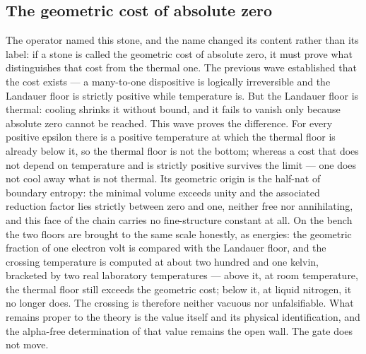 \documentclass[11pt]{article}
\theoremstyle{definition}\newtheorem{deriv}{Derivation}
\begin{document}
\subsection*{The geometric cost of absolute zero}The operator named this stone, and the name changed its content rather than its label: if a stone is called the geometric cost of absolute zero, it must prove what distinguishes that cost from the thermal one. The previous wave established that the cost exists --- a many-to-one dispositive is logically irreversible and the Landauer floor is strictly positive while temperature is. But the Landauer floor is thermal: cooling shrinks it without bound, and it fails to vanish only because absolute zero cannot be reached. This wave proves the difference. For every positive epsilon there is a positive temperature at which the thermal floor is already below it, so the thermal floor is not the bottom; whereas a cost that does not depend on temperature and is strictly positive survives the limit --- one does not cool away what is not thermal. Its geometric origin is the half-nat of boundary entropy: the minimal volume exceeds unity and the associated reduction factor lies strictly between zero and one, neither free nor annihilating, and this face of the chain carries no fine-structure constant at all. On the bench the two floors are brought to the same scale honestly, as energies: the geometric fraction of one electron volt is compared with the Landauer floor, and the crossing temperature is computed at about two hundred and one kelvin, bracketed by two real laboratory temperatures --- above it, at room temperature, the thermal floor still exceeds the geometric cost; below it, at liquid nitrogen, it no longer does. The crossing is therefore neither vacuous nor unfalsifiable. What remains proper to the theory is the value itself and its physical identification, and the alpha-free determination of that value remains the open wall. The gate does not move.
\end{document}
